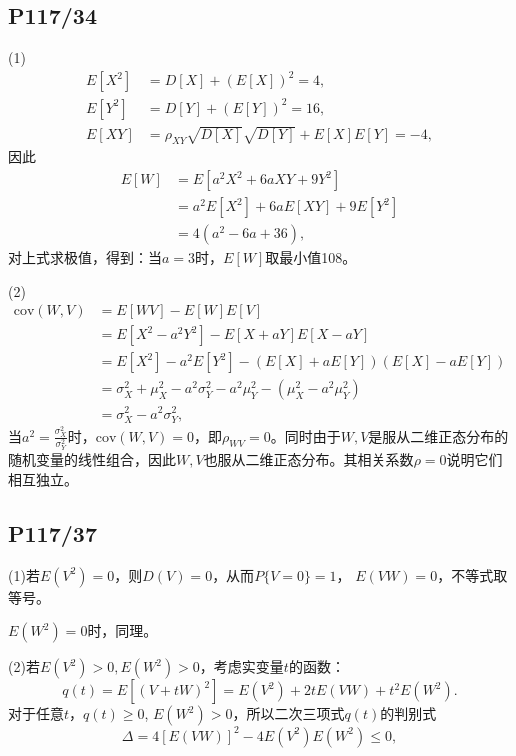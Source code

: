 \documentclass[UTF8,a4paper,10pt]{ctexart}
\begin{document}
\subsection{P117/34}
(1)
\begin{align}
    E[X^2] &= D[X] + (E[X])^2 = 4, \\
    E[Y^2] &= D[Y] + (E[Y])^2 = 16, \\
    E[XY] &= \rho_{XY}\sqrt{D[X]}\sqrt{D[Y]} + E[X]E[Y] = -4,
\end{align}
因此
\begin{align}
    E[W] &= E[a^2X^2 + 6aXY + 9Y^2] \nonumber \\
         &= a^2E[X^2] + 6aE[XY] + 9E[Y^2] \nonumber \\
         &= 4(a^2 - 6a + 36),
\end{align}
对上式求极值，得到：当$a = 3$时，$E[W]$取最小值108。

(2)
\begin{align}
    \mathrm{cov}(W,V) &= E[WV] - E[W]E[V]  \nonumber \\
                 &= E[X^2 - a^2Y^2] - E[X + aY]E[X - aY] \nonumber \\
                 &= E[X^2] - a^2E[Y^2] - (E[X] + aE[Y])(E[X] - aE[Y]) \nonumber \\
                 &= \sigma_X^2 + \mu_X^2 - a^2\sigma_Y^2 - a^2\mu_Y^2 - (\mu_X^2 - a^2\mu_Y^2) \nonumber \\
                 &= \sigma_X^2 - a^2\sigma_Y^2,
\end{align}
当$a^2 = \displaystyle\frac{\sigma_X^2}{\sigma_Y^2}$时，$\mathrm{cov}(W,V)=0$，即$\rho_{WV} = 0$。同时由于$W,V$是服从二维正态分布的随机变量的线性组合，因此$W,V$也服从二维正态分布。其相关系数$\rho = 0$说明它们相互独立。


\subsection{P117/37}
(1)若$E(V^2)=0$，则$D(V)=0$，从而$P\{V=0\}=1$， $E(VW)=0$，不等式取等号。

$E(W^2)=0$时，同理。

(2)若$E(V^2)>0, E(W^2)>0$，考虑实变量$t$的函数：
\begin{equation}
    q(t)=E[(V+tW)^2] = E(V^2) +2tE(VW)+t^2E(W^2).
\end{equation}
对于任意$t$，$q(t)\geq0$, $E(W^2)>0$，所以二次三项式$q(t)$的判别式
\begin{equation}
    \Delta = 4[E(VW)]^2-4E(V^2)E(W^2)\leq0,
\end{equation}
\end{document}
